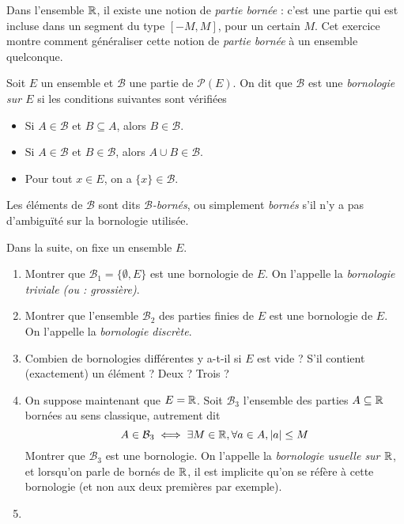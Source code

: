 \begin{exercice}[Bornologies]
Dans l'ensemble $\mathbb{R}$, il existe une notion de \emph{partie bornée} : c'est une partie qui est incluse dans un segment du type $[-M,M]$, pour un certain $M$. Cet exercice montre comment généraliser cette notion de \emph{partie bornée} à un ensemble quelconque.

Soit $E$ un ensemble et  $\mathcal B$ une partie de $\mathcal P(E)$. On dit que $\mathcal B$ est une \emph{bornologie sur $E$} si les conditions suivantes sont vérifiées
\begin{itemize}
\item Si $A\in \mathcal B$ et $B\subseteq A$, alors $B\in \mathcal B$.
\item Si $A\in \mathcal B$ et $B \in \mathcal B$, alors $A\cup B\in \mathcal B$.
\item Pour tout $x\in E$, on a  $\{x\} \in \mathcal B$.
\end{itemize}
Les éléments de $\mathcal B$ sont dits \emph{$\mathcal B$-bornés}, ou simplement \emph{bornés} s'il n'y a pas d'ambiguïté sur la bornologie utilisée.

Dans la suite, on fixe un ensemble $E$.
\begin{enumerate}
\item Montrer que $\mathcal B_1=\{\emptyset, E\}$ est une bornologie de $E$. On l'appelle la \emph{bornologie triviale (ou : grossière)}.
\item Montrer que l'ensemble $\mathcal B_2$ des parties finies de $E$ est une bornologie de $E$. On l'appelle la \emph{bornologie discrète}.
\item Combien de bornologies différentes y a-t-il si $E$ est vide ? S'il contient (exactement) un élément ? Deux ? Trois ?
\item On suppose maintenant que $E=\mathbb{R}$. Soit $\mathcal B_3$ l'ensemble des parties $A\subseteq \mathbb{R}$ bornées au sens classique, autrement dit 
\[ A\in \mathcal B_3 \iff \exists M\in \mathbb{R}, \forall a\in A, |a|\leq M\]
Montrer que $\mathcal B_3$ est une bornologie. On l'appelle la \emph{bornologie usuelle sur $\mathbb{R}$}, et lorsqu'on parle de bornés de $\mathbb{R}$, il est implicite qu'on se réfère à cette bornologie (et non aux deux premières par exemple).
\item 
\end{enumerate}
\end{exercice}

